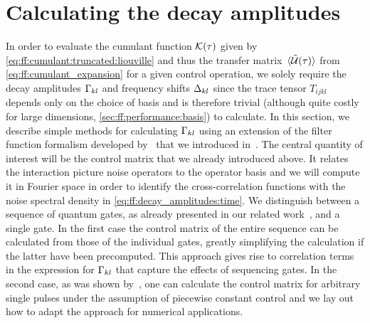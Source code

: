 
\section{Calculating the decay amplitudes}\label{sec:ff:theory:decay_amplitudes}
In order to evaluate the cumulant function $\mathcal{K}(\tau)$ given by \cref{eq:ff:cumulant:truncated:liouville} and thus the transfer matrix $\ev*{\liouvUe(\tau)}$ from \cref{eq:ff:cumulant_expansion} for a given control operation, we solely require the decay amplitudes $\Gamma_{kl}$ and frequency shifts $\Delta_{kl}$ since the trace tensor $T_{ijkl}$ depends only on the choice of basis and is therefore trivial (although quite costly for large dimensions, \cf \cref{sec:ff:performance:basis}) to calculate.
In this section, we describe simple methods for calculating $\Gamma_{kl}$ using an extension of the filter function formalism developed by~\citeauthor{Green2013} that we introduced in~.
The central quantity of interest will be the control matrix that we already introduced above.
It relates the interaction picture noise operators to the operator basis and we will compute it in Fourier space in order to identify the cross-correlation functions with the noise spectral density in \cref{eq:ff:decay_amplitudes:time}.
We distinguish between a sequence of quantum gates, as already presented in our related work~\cite{Cerfontaine2021}, and a single gate.
In the first case the control matrix of the entire sequence can be calculated from those of the individual gates, greatly simplifying the calculation if the latter have been precomputed.
This approach gives rise to correlation terms in the expression for $\Gamma_{kl}$ that capture the effects of sequencing gates.
In the second case, as was shown by~\citeauthor{Green2013}, one can calculate the control matrix for arbitrary single pulses under the assumption of piecewise constant control and we lay out how to adapt the approach for numerical applications.

